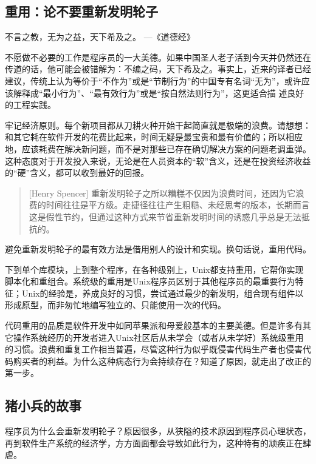 \documentclass[12pt,oneside]{book}
\begin{document}
\begin{common-format}
\chapter{重用：论不要重新发明轮子}
\begin{flushright}
\begin{notecard}{15em}
不言之教，无为之益，天下希及之。
{\hfill —《道德经》}
\end{notecard}
\end{flushright}

不愿做不必要的工作是程序员的一大美德。如果中国圣人老子活到今天并仍然还在传道的话，他可能会被错解为：不编之码，天下希及之。事实上，近来的译者已经建议，传统上认为等价于“不作为”或是“节制行为”的中国专有名词“无为”，或许应该解释成“最小行为”、“最有效行为”或是“按自然法则行为”，这更适合描
述良好的工程实践。

牢记经济原则。每个新项目都从刀耕火种开始干起简直就是极端的浪费。请想想：和其它耗在软件开发的花费比起来，时间无疑是最宝贵和最有价值的；所以相应地，应该耗费在解决新问题，而不是对那些已存在确切解决方案的问题老调重弹。这种态度对于开发投入来说，无论是在人员资本的“软”含义，还是在投资经济收益的“硬”含义，都可以收到最好的回报。

\begin{quote}[Henry Spencer]
重新发明轮子之所以糟糕不仅因为浪费时间，还因为它浪费的时间往往是平方级。走捷径往往产生粗糙、未经思考的版本，长期而言这是假性节约，但通过这种方式来节省重新发明时间的诱惑几乎总是无法抵抗的。
\end{quote}

避免重新发明轮子的最有效方法是借用别人的设计和实现。换句话说，重用代码。

下到单个库模块，上到整个程序，在各种级别上，Unix都支持重用，它帮你实现脚本化和重组合。系统级的重用是Unix程序员区别于其他程序员的最重要行为特征；Unix的经验是，养成良好的习惯，尝试通过最少的新发明，组合现有组件以形成原型，而非匆忙地编写独立的、只能使用一次的代码。

代码重用的品质是软件开发中如同苹果派和母爱般基本的主要美德。但是许多有其它操作系统经历的开发者进入Unix社区后从未学会（或者从未学好）系统级重用的习惯。浪费和重复工作相当普遍，尽管这种行为似乎既侵害代码生产者也侵害代码购买者的利益。为什么这种病态行为会持续存在？知道了原因，就走出了改正的第一步。

\section{猪小兵的故事}
程序员为什么会重新发明轮子？原因很多，从狭隘的技术原因到程序员心理状态，再到软件生产系统的经济学，方方面面都会导致如此行为，这种特有的顽疾正在肆虐。


\end{common-format}
\end{document}
